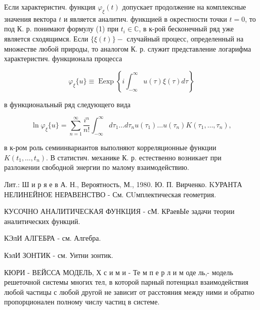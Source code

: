 \documentclass[10pt]{article}
\begin{document}
Если характеристич. функция $\varphi_{\xi}(t)$ допускает продолжение на комплексные значения вектора $t$ и является аналитич. функщией в окрестности точки $t=0$, то под К. р. понимают формулу (1) при $t_{i} \in \mathbb{C}$, в к-рой бесконечный ряд уже является сходящимся. Если $\{\xi(t)\}-$ случайный процесс, определенный на множестве любой природы, то аналогом К. р. служит представление логарифма характеристич. функционала процесса



\[

\varphi_{\xi}\{u\} \equiv \operatorname{Eexp}\left\{i \int_{-\infty}^{\infty} u(\tau) \xi(\tau) d \tau\right\}

\]



в функциональный ряд следующего вида



\[

\ln \varphi_{\xi}\{u\}=\sum_{n=1}^{\infty} \frac{i^{n}}{n !} \int_{-\infty}^{\infty} d \tau_{1} \ldots d \tau_{n} u\left(\tau_{1}\right) \ldots u\left(\tau_{n}\right) K\left(\tau_{1}, \ldots, \tau_{n}\right),

\]



в к-ром роль семиинвариантов выполняют корреляционные функции $K\left(t_{1}, \ldots, t_{n}\right)$. В статистич. механике К. р. естественно возникает при разложении свободной энергии по малому взаимодействию.



Лит.: Ш и р я е в А. Н., Вероятность, М., 1980. Ю. П. Вирченко. KУРАНТА НЕЛИНЕЙНОЕ НЕРАВЕНСТВО - См. СUмплектическая геометрия.



КУСОЧНО АНАЛИТИЧЕСКАЯ ФУНКЦИЯ - сМ. КРаевЫе задачи теории аналитических функций.



КЭлИ АЛГЕБРА - см. Алгебра.



КэлИ ЗОНТИК - см. Уитни зонтик.



КЮРИ - ВЕЙССА МОДЕЛЬ, Х с и м и - Те м п е р л и м оде ль,- модель решеточной системы многих тел, в которой парный потенциал взаимодействия любой частицы с любой другой не зависит от расстояния между ними и обратно пропорционален полному числу частиц в системе.
\end{document}
